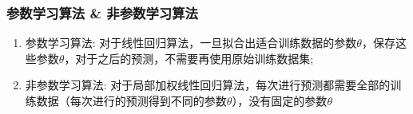 \subsubsection{参数学习算法 \& 非参数学习算法}
\begin{enumerate}
	\item 参数学习算法: 对于线性回归算法，一旦拟合出适合训练数据的参数$\theta$，保存这些参数$\theta$，对于之后的预测，不需要再使用原始训练数据集; 
	\item 非参数学习算法: 对于局部加权线性回归算法，每次进行预测都需要全部的训练数据（每次进行的预测得到不同的参数$\theta$），没有固定的参数$\theta$
\end{enumerate}











































